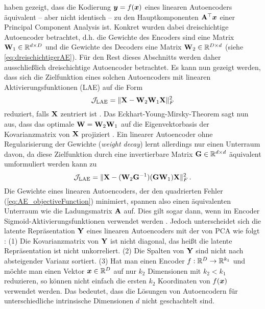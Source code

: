 \textcite{Bourlard.1988} haben gezeigt, dass die Kodierung $\bm{y} = f(\bm{x})$ eines linearen Autoencoders äquivalent -- aber nicht identisch -- zu den Hauptkomponenten $\mathbf{A}^\top\bm{x}$ einer Principal Component Analysis ist. Konkret wurden dabei dreischichtige Autoencoder betrachtet, d.h. die Gewichte des Encoders sind eine Matrix $\mathbf{W}_1 \in \mathbb{R}^{d \times D}$ und die Gewichte des
Decoders eine Matrix $\mathbf{W}_2 \in \mathbb{R}^{D \times d}$ (siehe \eqref{eq:dreischichtigerAE}). Für den Rest dieses Abschnitts werden daher ausschließlich dreischichtige Autoencoder betrachtet. Es kann nun gezeigt werden, dass sich die Zielfunktion eines solchen Autoencoders mit linearen Aktivierungsfunktionen (LAE) auf die Form
\begin{equation}
	\mathcal{J}_{\text{LAE}} = \lVert\mathbf{X} - \mathbf{W}_2\mathbf{W}_1\mathbf{X}\rVert_F^2
\end{equation}
reduziert, falls $\mathbf{X}$ zentriert ist \parencites[Appendix A]{Kunin.2019}[292 -- 293]{Bourlard.1988}. Das Eckhart-Young-Mirsky-Theorem \parencite{Eckart.1936} sagt nun aus, dass das optimale $\mathbf{W} = \mathbf{W}_2 \mathbf{W}_1$ auf die
Eigenvektorbasis der Kovarianzmatrix von $\mathbf{X}$ projiziert \parencite[vgl.][1]{Kunin.2019}. Ein linearer Autoencoder ohne Regularisierung der Gewichte
(\textit{weight decay}) lernt allerdings nur einen Unterraum davon, da diese Zielfunktion durch
eine invertierbare Matrix $\mathbf{G} \in \mathbb{R}^{d \times d}$ äquivalent umformuliert werden kann zu \parencite[1]{Kunin.2019}
\begin{equation}
	\label{eq:PCA_AE_Unterraum_Inverse}
	\mathcal{J}_{\text{LAE}} = \lVert\mathbf{X} - (\mathbf{W}_2\mathbf{G}^{-1}) (\mathbf{G} \mathbf{W}_1)\mathbf{X}\rVert_F^2 \, .
\end{equation}
Die Gewichte eines linearen Autoencoders, der den quadrierten Fehler
(\eqref{eq:AE_objectiveFunction}) minimiert, spannen also einen äquivalenten Unterraum wie die
Ladungsmatrix $\mathbf{A}$ auf. Dies gilt sogar dann, wenn im Encoder Sigmoid-Aktivierungsfunktionen verwendet werden \parencite[291, 293]{Bourlard.1988}. Jedoch unterscheidet sich die latente Repräsentation $\mathbf{Y}$
eines linearen Autoencoders mit der von PCA wie folgt \parencite[3]{Plaut.2018}: (1) Die Kovarianzmatrix von $\mathbf{Y}$ ist nicht diagonal, das heißt die
latente Repräsentation ist nicht unkorreliert. (2) Die Spalten von $\mathbf{Y}$ sind nicht nach
absteigender Varianz sortiert. (3) Hat man einen Encoder $f: \mathbb{R}^D \rightarrow \mathbb{R}^{k_1}$ und
möchte man einen Vektor $\bm{x} \in \mathbb{R}^D$ auf nur $k_2$ Dimensionen mit $k_2 < k_1$
reduzieren, so können nicht einfach die ersten $k_2$ Koordinaten von $f(\bm{x})$ verwendet
werden. Das bedeutet, dass die Lösungen von Autoencodern für unterschiedliche intrinsische
Dimensionen $d$ nicht geschachtelt sind.

